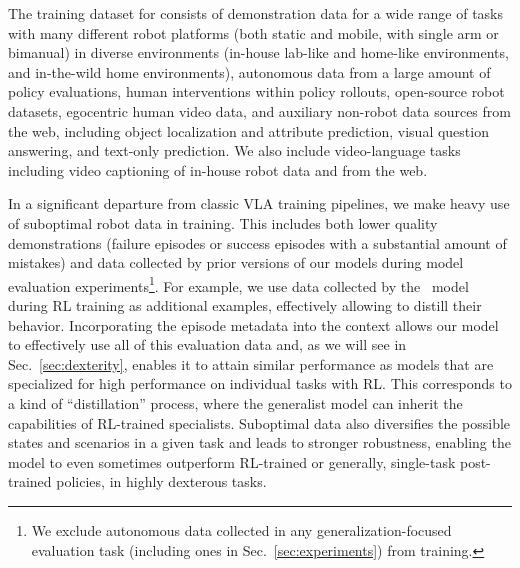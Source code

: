 



The training dataset for \MethodName{} consists of demonstration data for a wide range of tasks with many different robot platforms (both static and mobile, with single arm or bimanual) in diverse environments (in-house lab-like and home-like environments, and in-the-wild home environments), autonomous data from a large amount of policy evaluations, human interventions within policy rollouts, open-source robot datasets, egocentric human video data, and auxiliary non-robot data sources from the web, including object localization and attribute prediction, visual question answering, and text-only prediction. We also include video-language tasks including video captioning of in-house robot data and from the web.

In a significant departure from classic VLA training pipelines, we make heavy use of suboptimal robot data in training. This includes both lower quality demonstrations (failure episodes or success episodes with a substantial amount of mistakes) and data collected by prior versions of our models during model evaluation experiments\footnote{We exclude autonomous data collected in any generalization-focused evaluation task (including ones in Sec.~\ref{sec:experiments}) from training.}. For example, we use data collected by the \Piszs\ model during RL training as additional examples, effectively allowing \MethodName{} to distill their behavior. Incorporating the episode metadata into the context allows our model to effectively use all of this evaluation data and, as we will see in Sec.~\ref{sec:dexterity}, enables it to attain similar performance as models that are specialized for high performance on individual tasks with RL. This corresponds to a kind of ``distillation'' process, where the generalist \MethodName{} model can inherit the capabilities of RL-trained specialists. Suboptimal data also diversifies the possible states and scenarios in a given task and leads to stronger robustness, enabling the model to even sometimes outperform RL-trained or generally, single-task post-trained policies, in highly dexterous tasks.


